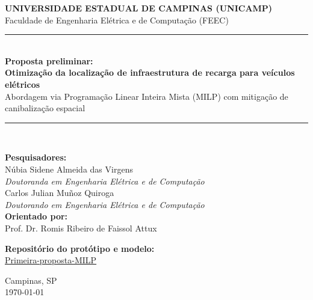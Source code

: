 \begin{titlepage}
    \centering
    
    {\scshape \Large \textbf{UNIVERSIDADE ESTADUAL DE CAMPINAS (UNICAMP)}}\\[0.5cm]
    {\large Faculdade de Engenharia Elétrica e de Computação (FEEC)}\\[2.0cm]

    \rule{\linewidth}{0.5mm} \\[0.4cm]
    { \huge \bfseries Proposta preliminar: \\[0.3cm] Otimização da localização de infraestrutura de recarga para veículos elétricos }\\[0.2cm]
    { \Large Abordagem via Programação Linear Inteira Mista (MILP) com mitigação de canibalização espacial }\\[0.4cm]
    \rule{\linewidth}{0.5mm} \\[2.0cm]
    
    \begin{minipage}{0.8\textwidth}
        \centering
        \textbf{Pesquisadores:}\\[0.4cm]
        {\Large Núbia Sidene Almeida das Virgens}\\[0.2em]
        \textit{Doutoranda em Engenharia Elétrica e de Computação}\\[0.6cm]

        {\Large Carlos Julian Muñoz Quiroga}\\[0.2em]
        \textit{Doutorando em Engenharia Elétrica e de Computação}\\[0.8cm]

        \textbf{Orientado por:}\\[0.2em]
        {\Large Prof. Dr. Romis Ribeiro de Faissol Attux}\\
    \end{minipage}
    
    \vspace{1.5cm}
    
    \textbf{Repositório do protótipo e modelo:}\\
    \href{https://github.com/Carmuzqui/Primeira-proposta-MILP}{Primeira-proposta-MILP}
    
    \vfill
    
    {\large Campinas, SP}\\
    {\large \today}
    
\end{titlepage}

